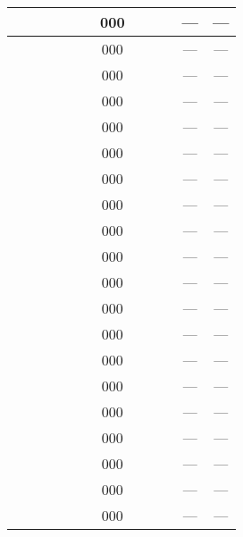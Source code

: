 \begin{flushleft}
\begin{tabular}{|c|c|c|c|c|c|c|c|c|c|c|c|}
&  &  &  &  &  & 000 &  &  &  & --- & ---	 \\\hline

&  &  &  &  &  & 000 &  &  &  & --- & ---	 \\\hline

&  &  &  &  &  & 000 &  &  &  & --- & ---	 \\\hline

&  &  &  &  &  & 000 &  &  &  & --- & ---	 \\\hline

&  &  &  &  &  & 000 &  &  &  & --- & ---	 \\\hline

&  &  &  &  &  & 000 &  &  &  & --- & ---	 \\\hline

&  &  &  &  &  & 000 &  &  &  & --- & ---	 \\\hline

&  &  &  &  &  & 000 &  &  &  & --- & ---	 \\\hline

&  &  &  &  &  & 000 &  &  &  & --- & ---	 \\\hline

&  &  &  &  &  & 000 &  &  &  & --- & ---	 \\\hline

&  &  &  &  &  & 000 &  &  &  & --- & ---	 \\\hline

&  &  &  &  &  & 000 &  &  &  & --- & ---	 \\\hline

&  &  &  &  &  & 000 &  &  &  & --- & ---	 \\\hline

&  &  &  &  &  & 000 &  &  &  & --- & ---	 \\\hline

&  &  &  &  &  & 000 &  &  &  & --- & ---	 \\\hline

&  &  &  &  &  & 000 &  &  &  & --- & ---	 \\\hline

&  &  &  &  &  & 000 &  &  &  & --- & ---	 \\\hline

&  &  &  &  &  & 000 &  &  &  & --- & ---	 \\\hline

&  &  &  &  &  & 000 &  &  &  & --- & ---	 \\\hline

&  &  &  &  &  & 000 &  &  &  & --- & ---	 \\\hline


\end{tabular}
\end{flushleft}
